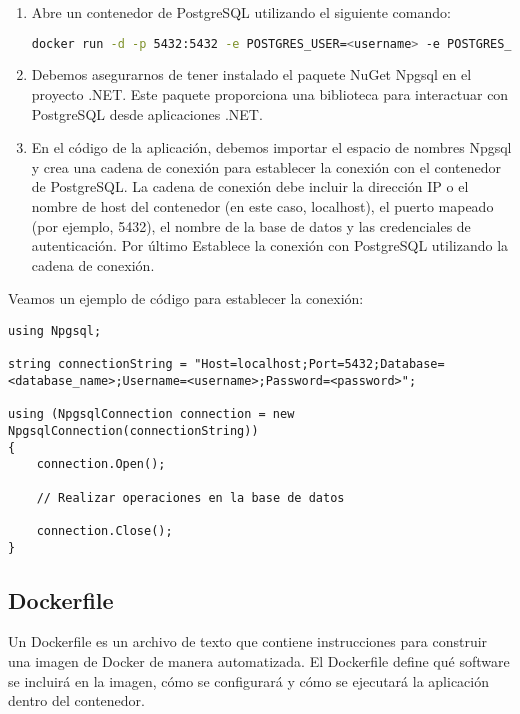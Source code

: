 \documentclass{article}
\begin{document}
\begin{enumerate}
    \item Abre un contenedor de PostgreSQL utilizando el siguiente comando:
  
\begin{lstlisting}[language=bash]
docker run -d -p 5432:5432 -e POSTGRES_USER=<username> -e POSTGRES_PASSWORD=<password> postgres
\end{lstlisting}
  
  \item Debemos asegurarnos de tener instalado el paquete NuGet Npgsql en el proyecto .NET. Este paquete proporciona una biblioteca para interactuar con PostgreSQL desde aplicaciones .NET.
  
  \item En el código de la aplicación, debemos importar el espacio de nombres Npgsql y crea una cadena de conexión para establecer la conexión con el contenedor de PostgreSQL. La cadena de conexión debe incluir la dirección IP o el nombre de host del contenedor (en este caso, localhost), el puerto mapeado (por ejemplo, 5432), el nombre de la base de datos y las credenciales de autenticación. Por último Establece la conexión con PostgreSQL utilizando la cadena de conexión.
\end{enumerate}

Veamos un ejemplo de código para establecer la conexión:

\begin{lstlisting}[language={[sharp]c}]
using Npgsql;

string connectionString = "Host=localhost;Port=5432;Database=<database_name>;Username=<username>;Password=<password>";

using (NpgsqlConnection connection = new NpgsqlConnection(connectionString))
{
    connection.Open();
    
    // Realizar operaciones en la base de datos
    
    connection.Close();
}
\end{lstlisting}

\subsection{Dockerfile}
Un Dockerfile es un archivo de texto que contiene instrucciones para construir una imagen de Docker de manera automatizada. El Dockerfile define qué software se incluirá en la imagen, cómo se configurará y cómo se ejecutará la aplicación dentro del contenedor.
\end{document}
